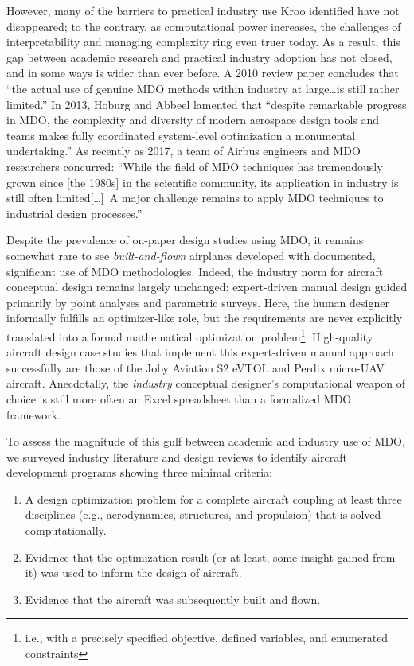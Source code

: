 However, many of the barriers to practical industry use Kroo identified have not disappeared; to the contrary, as computational power increases, the challenges of interpretability and managing complexity ring even truer today. As a result, this gap between academic research and practical industry adoption has not closed, and in some ways is wider than ever before. A 2010 review paper \cite{agte_mdo_2010} concludes that ``the actual use of genuine MDO methods within industry at large\dots is still rather limited.'' In 2013, Hoburg and Abbeel lamented that ``despite remarkable progress in MDO, the complexity and diversity of modern aerospace design tools and teams makes fully coordinated system-level optimization a monumental undertaking.'' \cite{hoburg_geometric_2014} As recently as 2017, a team of Airbus engineers and MDO researchers concurred: ``While the field of MDO techniques has tremendously grown since [the 1980s] in the scientific community, its application in industry is still often limited[\dots]\ A major challenge remains to apply MDO techniques to industrial design processes.'' \cite{gazaix_industrialization_2017}


Despite the prevalence of on-paper design studies using MDO, it remains somewhat rare to see \textit{built-and-flown} airplanes developed with documented, significant use of MDO methodologies. Indeed, the industry norm for aircraft conceptual design remains largely unchanged: expert-driven manual design guided primarily by point analyses and parametric surveys. Here, the human designer informally fulfills an optimizer-like role, but the requirements are never explicitly translated into a formal mathematical optimization problem\footnote{i.e., with a precisely specified objective, defined variables, and enumerated constraints}. High-quality aircraft design case studies that implement this expert-driven manual approach successfully are those of the Joby Aviation S2 eVTOL \cite{stoll_conceptual_2014} and Perdix micro-UAV \cite{tao_design_2012} aircraft. Anecdotally, the \textit{industry} conceptual designer's computational weapon of choice is still more often an Excel spreadsheet than a formalized MDO framework.

To assess the magnitude of this gulf between academic and industry use of MDO, we surveyed industry literature and design reviews to identify aircraft development programs showing three minimal criteria:
\begin{enumerate}[noitemsep]
    \item A design optimization problem for a complete aircraft coupling at least three disciplines (e.g., aerodynamics, structures, and propulsion) that is solved computationally.
    \item Evidence that the optimization result (or at least, some insight gained from it) was used to inform the design of aircraft.
    \item Evidence that the aircraft was subsequently built and flown.
\end{enumerate}

